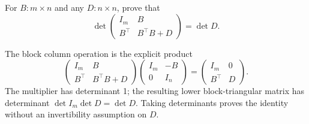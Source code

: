 \begin{problem}\label{ex:05:product-block}
For \(B:m\times n\) and any \(D:n\times n\), prove that
\[
\det\begin{pmatrix}I_m&B\\B^\top&B^\top B+D\end{pmatrix}=\det D.
\]
\end{problem}
\begin{solution}
The block column operation is the explicit product
\[
\begin{pmatrix}I_m&B\\B^\top&B^\top B+D\end{pmatrix}
\begin{pmatrix}I_m&-B\\0&I_n\end{pmatrix}
=\begin{pmatrix}I_m&0\\B^\top&D\end{pmatrix}.
\]
The multiplier has determinant 1; the resulting lower block-triangular
matrix has determinant \(\det I_m\det D=\det D\).
Taking determinants proves the identity without an invertibility assumption on \(D\).
\end{solution}

